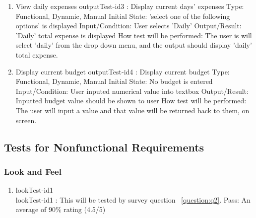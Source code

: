 \documentclass[12pt, titlepage]{article}
\begin{document}
\begin{enumerate}
\item{View daily expenses}
\newline
outputTest-id3 : Display current days' expenses
\newline
Type: Functional, Dynamic, Manual 
\newline
Initial State: 'select one of the following options' is displayed 
\newline
Input/Condition: User selects 'Daily'
\newline
Output/Result: 'Daily' total expense is displayed
\newline
How test will be performed: The user is will select 'daily' from the drop down menu, and the output should display 'daily' total expense.

\item{Display current budget}
\newline
outputTest-id4 : Display current budget
\newline
Type: Functional, Dynamic, Manual 
\newline
Initial State: No budget is entered
\newline
Input/Condition: User inputed numerical value into textbox
\newline
Output/Result: Inputted budget value should be shown to user
\newline
How test will be performed: The user will input a value and that value will be returned back to them, on screen.

\end{enumerate}

\subsection{Tests for Nonfunctional Requirements}

\subsubsection{Look and Feel}
\begin{enumerate}
\item{lookTest-id1\\}
lookTest-id1 : This will be tested by survey question ~\ref{question:q2}.
\newline
	Pass: An average of 90\% rating (4.5/5)


\end{enumerate}
\end{document}
